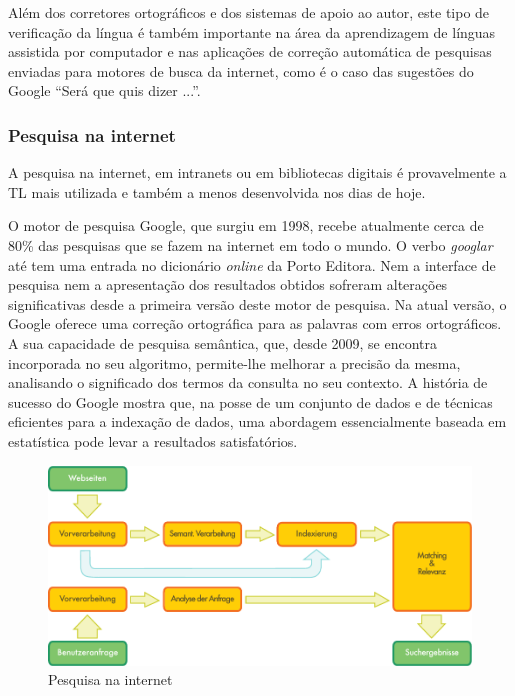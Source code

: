 \begin{multicols}{2}
Além dos corretores ortográficos e dos sistemas de apoio ao autor, este tipo de verificação da língua é também importante na área da aprendizagem de línguas assistida por computador e nas aplicações de correção automática de pesquisas enviadas para motores de busca da internet, como é o caso das sugestões do Google “Será que quis dizer ...”.

\subsubsection{Pesquisa na internet}

 A pesquisa na internet, em intranets ou em bibliotecas digitais é provavelmente a TL mais utilizada e também a menos desenvolvida nos dias de hoje.

O motor de pesquisa Google, que surgiu em 1998, recebe atualmente cerca de 80\% das pesquisas que se fazem na internet em todo o mundo\cite{spi1}. O verbo \textit{googlar} até tem uma entrada no dicionário \textit{online} da Porto Editora. Nem a interface de pesquisa nem a apresentação dos resultados obtidos sofreram alterações significativas desde a primeira versão deste motor de pesquisa. Na atual versão, o Google o\-fe\-re\-ce uma correção ortográfica para as palavras com erros ortográficos. A sua capacidade de pesquisa semântica, que, desde 2009, se encontra incorporada no seu algoritmo, permite-lhe melhorar a precisão da mesma, analisando o significado dos termos da consulta no seu contexto\cite{pc1}. A história de sucesso do Google mostra que, na posse de um conjunto de dados e de técnicas eficientes para a indexação de dados, uma abordagem essencialmente baseada em estatística pode levar a resultados satisfatórios.

\begin{figure}[htb]
  \center
  \includegraphics[width=\textwidth]{../_media/german/web_search_architecture}
  \caption{Pesquisa na internet}
  \label{fig:websearcharch_de}
\end{figure}


\end{multicols}
